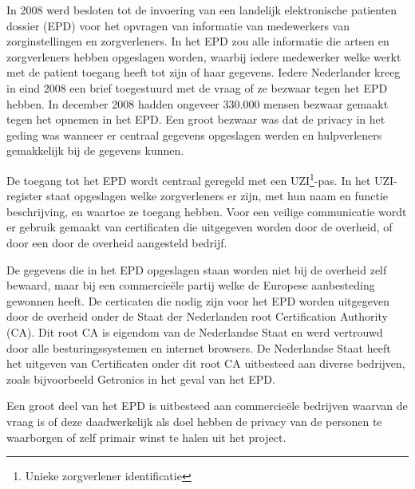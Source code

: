 In 2008 werd besloten tot de invoering van een landelijk elektronische patienten dossier (EPD) voor het opvragen van informatie van medewerkers van zorginstellingen en zorgverleners. In het EPD zou alle informatie die artsen en zorgverleners hebben opgeslagen worden, waarbij iedere medewerker welke werkt met de patient toegang heeft tot zijn of haar gegevens. Iedere Nederlander kreeg in eind 2008 een brief toegestuurd met de vraag of ze bezwaar tegen het EPD hebben. In december 2008 hadden ongeveer 330.000 mensen bezwaar gemaakt tegen het opnemen in het EPD\cite{bib.minvws.epdbezwaar}. Een groot bezwaar was dat de privacy in het geding was wanneer er centraal gegevens opgeslagen werden en hulpverleners gemakkelijk bij de gegevens kunnen.

De toegang tot het EPD wordt centraal geregeld met een UZI\footnote{Unieke zorgverlener identificatie}-pas. In het UZI-register staat opgeslagen welke zorgverleners er zijn, met hun naam en functie beschrijving, en waartoe ze toegang hebben. Voor een veilige communicatie wordt er gebruik gemaakt van certificaten die uitgegeven worden door de overheid, of door een door de overheid aangesteld bedrijf.

De gegevens die in het EPD opgeslagen staan worden niet bij de overheid zelf bewaard, maar bij een commercie\"{e}le partij welke de Europese aanbesteding gewonnen heeft. 
De certicaten die nodig zijn voor het EPD worden uitgegeven door de overheid onder de Staat der Nederlanden root Certification Authority (CA). Dit root CA is eigendom van de Nederlandse Staat en werd vertrouwd door alle besturingssystemen en internet browsers. De Nederlandse Staat heeft het uitgeven van Certificaten onder dit root CA uitbesteed aan diverse bedrijven, zoals bijvoorbeeld Getronics in het geval van het EPD\cite{bib.minvws.CPSUZI}.

Een groot deel van het EPD is uitbesteed aan commercie\"{e}le bedrijven waarvan de vraag is of deze daadwerkelijk als doel hebben de privacy van de personen te waarborgen of zelf primair winst te halen uit het project. 
